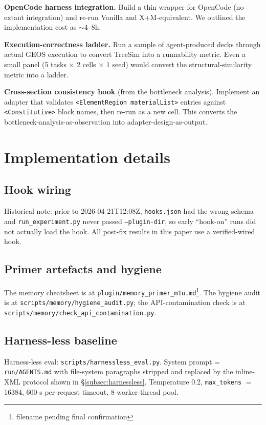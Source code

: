 \documentclass{article}
\begin{document}
\textbf{OpenCode harness integration.} Build a thin wrapper for OpenCode (no extant integration) and re-run Vanilla and X+M-equivalent. We outlined the implementation cost as $\sim$4--8h.

\textbf{Execution-correctness ladder.} Run a sample of agent-produced decks through actual GEOS execution to convert TreeSim into a runnability metric. Even a small panel (5 tasks × 2 cells × 1 seed) would convert the structural-similarity metric into a ladder.

\textbf{Cross-section consistency hook} (from the bottleneck analysis). Implement an adapter that validates \texttt{<ElementRegion materialList>} entries against \texttt{<Constitutive>} block names, then re-run as a new cell. This converts the bottleneck-analysis-as-observation into adapter-design-as-output.

\section{Implementation details}
\label{app:impl}

\subsection{Hook wiring}
Historical note: prior to 2026-04-21T12:08Z, \texttt{hooks.json} had the wrong schema and \texttt{run\_experiment.py} never passed \texttt{--plugin-dir}, so early ``hook-on'' runs did not actually load the hook. All post-fix results in this paper use a verified-wired hook.

\subsection{Primer artefacts and hygiene}
The memory cheatsheet is at \texttt{plugin/memory\_primer\_m1u.md}\footnote{filename pending final confirmation}. The hygiene audit is at \texttt{scripts/memory/hygiene\_audit.py}; the API-contamination check is at \texttt{scripts/memory/check\_api\_contamination.py}.

\subsection{Harness-less baseline}
Harness-less eval: \texttt{scripts/harnessless\_eval.py}. System prompt = \texttt{run/AGENTS.md} with file-system paragraphs stripped and replaced by the inline-XML protocol shown in \S\ref{subsec:harnessless}. Temperature 0.2, \texttt{max\_tokens} $=$ 16384, 600-s per-request timeout, 8-worker thread pool.
\end{document}
